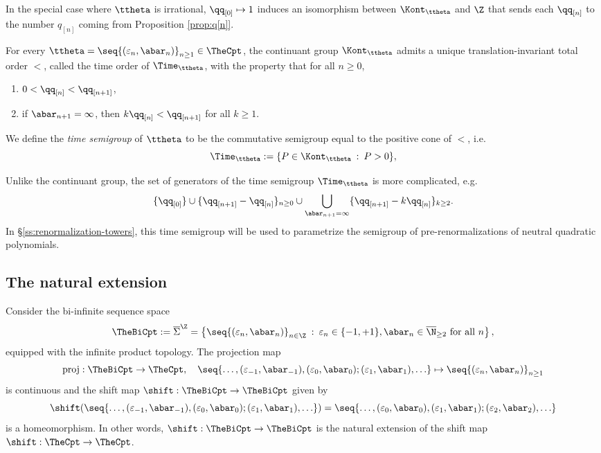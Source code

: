 \documentclass{amsart}
\begin{document}
In the special case where $\ttheta$ is irrational, $\qq_{[0]} \mapsto 1$ induces an isomorphism between $\Kont_{\ttheta}$ and $\Z$ that sends each $\qq_{[n]}$ to the number $q_{[n]}$ coming from Proposition \ref{prop:q[n]}.

\begin{proposition}
\label{prop:chronological-order-01}
    For every $\ttheta = \seq{ (\varepsilon_n, \abar_n) }_{n \geq 1} \in \TheCpt$, the continuant group $\Kont_{\ttheta}$ admits a unique translation-invariant total order $<$, called the time order of $\Time_{\ttheta}$, with the property that for all $n \geq 0$,
    \begin{enumerate}
        \item $0 < \qq_{[n]} < \qq_{[n+1]}$,
        \item if $\abar_{n+1} = \infty$, then $k \qq_{[n]} < \qq_{[n+1]}$ for all $k \geq 1$.
    \end{enumerate}
\end{proposition}

\begin{definition}
    We define the \emph{time semigroup} of $\ttheta$ to be the commutative semigroup equal to the positive cone of $<$, i.e.
    \[
    \Time_{\ttheta} := \{P \in \Kont_{\ttheta} \: : \: P > 0 \},
    \]
\end{definition}

Unlike the continuant group, the set of generators of the time semigroup $\Time_{\ttheta}$ is more complicated, e.g.
    \[
        \{\qq_{[0]}\} \cup \{ \qq_{[n+1]} - \qq_{[n]} \}_{n \geq 0} \cup \bigcup_{\abar_{n+1} = \infty} \{ \qq_{[n+1]} - k \qq_{[n]} \}_{k \geq 2}.
    \]
In \S\ref{ss:renormalization-towers}, this time semigroup will be used to parametrize the semigroup of pre-renormalizations of neutral quadratic polynomials.

\subsection{The natural extension}
\label{ss:natural-extension}

Consider the bi-infinite sequence space
\[
    \TheBiCpt := \overline{\Sigma}^{\Z} = 
    \left\{ \seq{ (\varepsilon_n, \abar_n) }_{n\in \Z} \: : \: 
    \varepsilon_{n} \in \{-1,+1\},
    \abar_n \in \overline{\N}_{\geq 2} \text{ for all } n \right\},
\]
equipped with the infinite product topology. 
The projection map
\[
    \textnormal{proj}: \TheBiCpt \to \TheCpt, \quad 
    \seq{ \ldots, (\varepsilon_{-1}, \abar_{-1}), (\varepsilon_0, \abar_0); (\varepsilon_1, \abar_1), \ldots } \mapsto \seq{ (\varepsilon_n, \abar_n) }_{n\geq 1}
\]
is continuous and the shift map $\shift: \TheBiCpt \to \TheBiCpt$ given by
\[
\shift( \seq{ \ldots, (\varepsilon_{-1}, \abar_{-1}), (\varepsilon_0, \abar_0); (\varepsilon_1, \abar_1), \ldots } ) = \seq{ \ldots, (\varepsilon_{0}, \abar_{0}), (\varepsilon_1, \abar_1); (\varepsilon_2, \abar_2), \ldots }
\]
is a homeomorphism.
In other words, $\shift: \TheBiCpt \to \TheBiCpt$ is the natural extension of the shift map $\shift: \TheCpt \to \TheCpt$.
\end{document}
